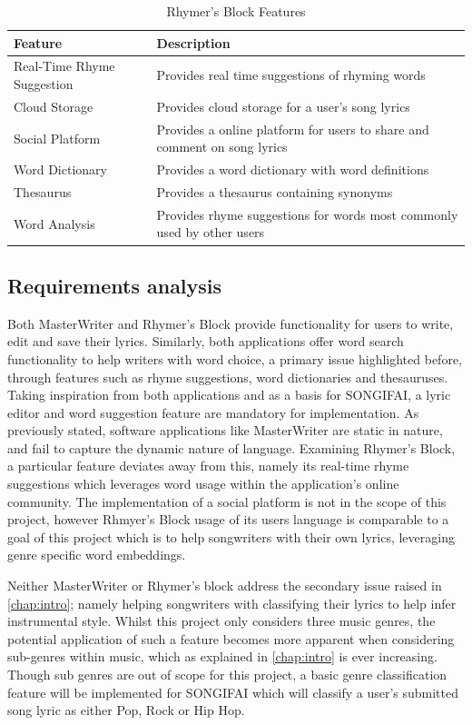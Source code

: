 \begin{table}[ht]
	\centering
	\begin{tabular}{ | l | p{10cm} |}
		\hline
		\textbf{Feature} & \textbf{Description}\\ \hline
		Real-Time Rhyme Suggestion & Provides real time suggestions of rhyming words \\ \hline
		Cloud Storage & Provides cloud storage for a user's song lyrics \\ \hline
		Social Platform & Provides a online platform for users to share and comment on song lyrics\\ \hline
		Word Dictionary & Provides a word dictionary with word definitions \\ \hline
		Thesaurus & Provides a thesaurus containing synonyms\\ \hline
		Word Analysis & Provides rhyme suggestions for words most commonly used by other users \\ \hline
	\end{tabular}
	\label{Tab:RhymersBlock}
	\caption{Rhymer's Block Features}
\end{table}

\subsection{Requirements analysis}
Both MasterWriter and Rhymer's Block provide functionality for users to write, edit and save their lyrics. Similarly, both applications offer word search functionality to help writers with word choice, a primary issue highlighted before, through features such as rhyme suggestions, word dictionaries and thesauruses. Taking inspiration from both applications and as a basis for SONGIFAI, a lyric editor and word suggestion feature are mandatory for implementation. As previously stated, software applications like MasterWriter are static in nature, and fail to capture the dynamic nature of language. Examining Rhymer's Block, a particular feature deviates away from this, namely its real-time rhyme suggestions which leverages word usage within the application's online community. The implementation of a social platform is not in the scope of this project, however Rhmyer's Block usage of its users language is comparable to a goal of this project which is to help songwriters with their own lyrics, leveraging genre specific word embeddings.

\noindent
\newline
Neither MasterWriter or Rhymer's block address the secondary issue raised in \autoref{chap:intro}; namely helping songwriters with classifying their lyrics to help infer instrumental style. Whilst this project only considers three music genres, the potential application of such a feature becomes more apparent when considering sub-genres within music, which as explained in \autoref{chap:intro} is ever increasing. Though sub genres are out of scope for this project, a basic genre classification feature will be implemented for SONGIFAI which will classify a user's submitted song lyric as either Pop, Rock or Hip Hop.

